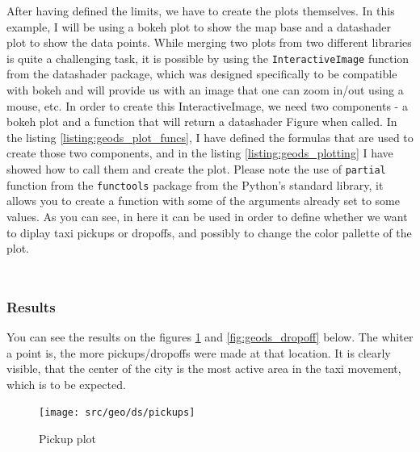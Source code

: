 \documentclass[12pt, a4paper]{article}
\begin{document}
After having defined the limits, we have to create the plots themselves. In this example, I will be using a bokeh plot to show the map base and a datashader plot to show the data points. While merging two plots from two different libraries is quite a challenging task, it is possible by using the \texttt{InteractiveImage} function from the datashader package, which was designed specifically to be compatible with bokeh and will provide us with an image that one can zoom in/out using a mouse, etc.  In order to create this InteractiveImage, we need two components - a bokeh plot and a function that will return a datashader Figure when called. In the listing \ref{listing:geods_plot_funcs}, I have defined the formulas that are used to create those two components, and in the listing \ref{listing:geods_plotting} I have showed how to call them and create the plot. Please note the use of \texttt{partial} function from the \texttt{functools} package from the Python's standard library, it allows you to create a function with some of the arguments already set to some values. As you can see, in here it can be used in order to define whether we want to diplay taxi pickups or dropoffs, and possibly to change the color pallette of the plot.

\bgroup
  \inputminted[linenos, breaklines=true, fontsize=\scriptsize, firstnumber=last]{python}{src/geo/ds/3b_plot_funcs.py}
  \label{listing:geods_plot_funcs}
\egroup

\bgroup
  \inputminted[linenos, breaklines=true, fontsize=\scriptsize, firstnumber=last]{python}{src/geo/ds/3c_plotting.py}
  \label{listing:geods_plotting}
\egroup

\subsubsection{Results}

You can see the results on the figures \ref{fig:geods_pickups} and \ref{fig:geods_dropoff} below. The whiter a point is, the more pickups/dropoffs were made at that location. It is clearly visible, that the center of the city is the most active area in the taxi movement, which is to be expected.

\begin{figure}[H]
    \centering
    \texttt{[image: src/geo/ds/pickups]}
    \caption{Pickup plot}
    \label{fig:geods_pickups}
\end{figure}
\end{document}
